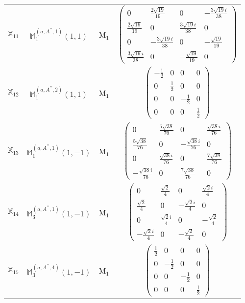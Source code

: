 \documentclass[fleqn,10pt,landscape]{article}
\begin{document}
\begin{itemize}
\begin{center}
\begin{longtable}{c|c|c|c}
$ \mathbb{X}_{11} $ & $\mathbb{M}_{1}^{(a,A^{\prime\prime},1)}(1,1)$ & M$_{1}$ & $\begin{pmatrix} 0 & \frac{2 \sqrt{19}}{19} & 0 & - \frac{3 \sqrt{19} i}{38} \\ \frac{2 \sqrt{19}}{19} & 0 & \frac{3 \sqrt{19} i}{38} & 0 \\ 0 & - \frac{3 \sqrt{19} i}{38} & 0 & - \frac{\sqrt{19}}{19} \\ \frac{3 \sqrt{19} i}{38} & 0 & - \frac{\sqrt{19}}{19} & 0 \end{pmatrix}$ \\
$ \mathbb{X}_{12} $ & $\mathbb{M}_{1}^{(a,A^{\prime\prime},2)}(1,1)$ & M$_{1}$ & $\begin{pmatrix} - \frac{1}{2} & 0 & 0 & 0 \\ 0 & \frac{1}{2} & 0 & 0 \\ 0 & 0 & - \frac{1}{2} & 0 \\ 0 & 0 & 0 & \frac{1}{2} \end{pmatrix}$ \\
$ \mathbb{X}_{13} $ & $\mathbb{M}_{1}^{(a,A^{\prime\prime},1)}(1,-1)$ & M$_{1}$ & $\begin{pmatrix} 0 & \frac{5 \sqrt{38}}{76} & 0 & \frac{\sqrt{38} i}{76} \\ \frac{5 \sqrt{38}}{76} & 0 & - \frac{\sqrt{38} i}{76} & 0 \\ 0 & \frac{\sqrt{38} i}{76} & 0 & \frac{7 \sqrt{38}}{76} \\ - \frac{\sqrt{38} i}{76} & 0 & \frac{7 \sqrt{38}}{76} & 0 \end{pmatrix}$ \\
$ \mathbb{X}_{14} $ & $\mathbb{M}_{3}^{(a,A^{\prime\prime},1)}(1,-1)$ & M$_{1}$ & $\begin{pmatrix} 0 & \frac{\sqrt{2}}{4} & 0 & \frac{\sqrt{2} i}{4} \\ \frac{\sqrt{2}}{4} & 0 & - \frac{\sqrt{2} i}{4} & 0 \\ 0 & \frac{\sqrt{2} i}{4} & 0 & - \frac{\sqrt{2}}{4} \\ - \frac{\sqrt{2} i}{4} & 0 & - \frac{\sqrt{2}}{4} & 0 \end{pmatrix}$ \\
$ \mathbb{X}_{15} $ & $\mathbb{M}_{3}^{(a,A^{\prime\prime},4)}(1,-1)$ & M$_{1}$ & $\begin{pmatrix} \frac{1}{2} & 0 & 0 & 0 \\ 0 & - \frac{1}{2} & 0 & 0 \\ 0 & 0 & - \frac{1}{2} & 0 \\ 0 & 0 & 0 & \frac{1}{2} \end{pmatrix}$ \\

\end{longtable}
\end{center}
\end{itemize}
\end{document}
